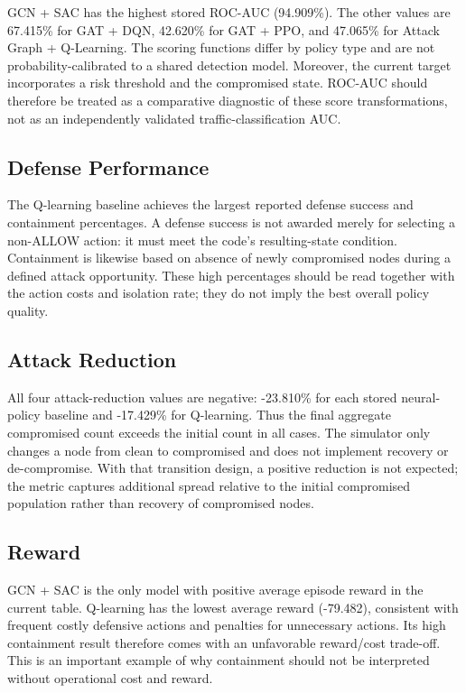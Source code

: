 \documentclass[12pt,a4paper]{report}
\begin{document}
GCN + SAC has the highest stored ROC-AUC (94.909\%). The other values are 67.415\% for GAT + DQN, 42.620\% for GAT + PPO, and 47.065\% for Attack Graph + Q-Learning. The scoring functions differ by policy type and are not probability-calibrated to a shared detection model. Moreover, the current target incorporates a risk threshold and the compromised state. ROC-AUC should therefore be treated as a comparative diagnostic of these score transformations, not as an independently validated traffic-classification AUC.

\subsection{Defense Performance}

The Q-learning baseline achieves the largest reported defense success and containment percentages. A defense success is not awarded merely for selecting a non-ALLOW action: it must meet the code's resulting-state condition. Containment is likewise based on absence of newly compromised nodes during a defined attack opportunity. These high percentages should be read together with the action costs and isolation rate; they do not imply the best overall policy quality.

\subsection{Attack Reduction}

All four attack-reduction values are negative: -23.810\% for each stored neural-policy baseline and -17.429\% for Q-learning. Thus the final aggregate compromised count exceeds the initial count in all cases. The simulator only changes a node from clean to compromised and does not implement recovery or de-compromise. With that transition design, a positive reduction is not expected; the metric captures additional spread relative to the initial compromised population rather than recovery of compromised nodes.

\subsection{Reward}

GCN + SAC is the only model with positive average episode reward in the current table. Q-learning has the lowest average reward (-79.482), consistent with frequent costly defensive actions and penalties for unnecessary actions. Its high containment result therefore comes with an unfavorable reward/cost trade-off. This is an important example of why containment should not be interpreted without operational cost and reward.
\end{document}
